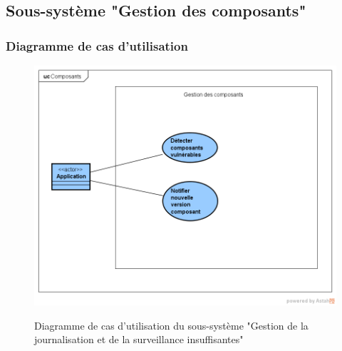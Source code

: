 \subsection{Sous-système "Gestion des composants"}
\subsubsection{Diagramme de cas d'utilisation}
\begin{figure}[H]
	\centering
	\begin{minipage}{12cm}
		\centering
		{\includegraphics[height=0.35\textheight, width=1\textwidth]{fig/Composants-use-case-diagram.png}}
	\end{minipage}
	\caption{Diagramme de cas d'utilisation du sous-système "Gestion de la journalisation et de la surveillance insuffisantes"}
	\label{fig:7.20}
\end{figure}
